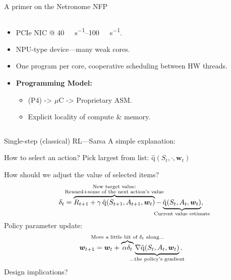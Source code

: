 \documentclass[aspectratio=169,xcolor={dvipsnames}
,handout
]{beamer}
\newcommand{\acval}[3]{\ensuremath{\operatorname{\hat{q}}(#1, #2, #3)}}
\newcommand{\wvec}[1]{\ensuremath{\bm{w}_{#1}}}
\begin{document}
\begin{frame}{A primer on the Netronome NFP}
	\begin{columns}
		\begin{column}{0.6\linewidth}
			\begin{itemize}
				\item PCIe NIC @ \qtyrange{40}{100}{\giga\bit\per\second}.
				\item \alert{NPU-type device}---many weak cores.
				\item One program per core, cooperative scheduling between HW threads.
				\item \textbf{Programming Model:}
				\begin{itemize}
					\item (P4) -> $\mu$C -> Proprietary ASM.
					\item Explicit locality of compute \& memory.
				\end{itemize}
			\end{itemize}
		\end{column}
		\begin{column}{0.4\linewidth}
			\centering
		\end{column}
	\end{columns}
\end{frame}

\begin{frame}{Single-step (classical) RL---Sarsa}
	A simple explanation:\pause
	
	How to select an action? Pick largest from list: $\acval{S_t}{\cdot}{\wvec{t}}$\pause
	
	How should we adjust the value of selected items?
	$$
			\delta_t = \overbrace{R_{t+1} + \gamma \acval{S_{t+1}}{A_{t+1}}{\wvec{t}}}^{\mathclap{\substack{\text{New target value:}\\ \text{Reward} + \text{some of the next action's value}}}} - \underbrace{\acval{S_t}{A_t}{\wvec{t}}}_{\mathclap{\text{Current value estimate}}},
	$$\pause
	Policy parameter update:
	$$
			\bm{w}_{t+1} = \bm{w}_{t} + \overbrace{\alpha \delta_t}^{\mathclap{\text{Move a little bit of } \delta_t \text{ along...}}} \underbrace{\nabla{\acval{S_t}{A_t}{\wvec{t}}}}_{\mathclap{\text{...the policy's gradient}}}.
	$$\pause
	Design implications?
\end{frame}
\end{document}
